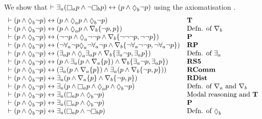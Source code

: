 \begin{example}\label{rml-s5-example-derivation}
We show that $\proves \somerefsA (\necessaryA \atomP \land \lnot \necessaryB \atomP) \iff (\atomP \land \possibleB \lnot \atomP)$ using the axiomatisation \axiomRmlS{}.
$$
\begin{array}{ll}
    \proves (\atomP \land \possibleB \lnot \atomP) \iff (\atomP \land \possibleA \atomP \land \possibleB \lnot \atomP) & {\bf T}\\
    \proves (\atomP \land \possibleB \lnot \atomP) \iff (\atomP \land \possibleA \atomP \land \coversB \{\lnot \atomP, \atomP\}) & \text{Defn. of $\coversB$}\\
    \proves (\atomP \land \possibleB \lnot \atomP) \iff (\lnot \lnot \atomP \land \possibleA \lnot \lnot \atomP \land \coversB \{\lnot \lnot \lnot \atomP, \lnot \lnot \atomP\}) & {\bf P}\\
    \proves (\atomP \land \possibleB \lnot \atomP) \iff (\lnot \allrefsA \lnot \atomP \possibleA \lnot \allrefsA \lnot \atomP \land \coversB \{\lnot \allrefsA \lnot \lnot \atomP, \lnot \allrefsA \lnot \atomP\}) & {\bf RP}\\
    \proves (\atomP \land \possibleB \lnot \atomP) \iff (\somerefsA \atomP \land \possibleA \somerefsA \atomP \land \coversB \{\somerefsA \lnot \atomP, \somerefsA \atomP\}) & \text{Defn. of $\somerefsA$}\\
    \proves (\atomP \land \possibleB \lnot \atomP) \iff (\atomP \land \somerefsA (\atomP \land \coversA \{\atomP\}) \land \coversB \{\somerefsA \lnot \atomP, \somerefsA \atomP\}) & {\bf RS5}\\
    \proves (\atomP \land \possibleB \lnot \atomP) \iff (\somerefsA (\atomP \land \coversA \{\atomP\}) \land \somerefsA (\atomP \land \coversB \{\lnot \atomP, \atomP\})) & {\bf RComm}\\
    \proves (\atomP \land \possibleB \lnot \atomP) \iff \somerefsA (\atomP \land \coversA \{\atomP\} \land \coversB \{\lnot \atomP, \atomP\}) & {\bf RDist}\\
    \proves (\atomP \land \possibleB \lnot \atomP) \iff \somerefsA (\atomP \land \necessaryA \atomP \land \possibleA \atomP \land \possibleB \lnot \atomP) & \text{Defn. of $\coversA$ and $\coversB$}\\
    \proves (\atomP \land \possibleB \lnot \atomP) \iff \somerefsA (\necessaryA \atomP \land \possibleB \lnot \atomP) & \text{Modal reasoning and {\bf T}}\\
    \proves (\atomP \land \possibleB \lnot \atomP) \iff \somerefsA (\necessaryA \atomP \land \possibleB \lnot \atomP) & {\bf P}\\
    \proves (\atomP \land \possibleB \lnot \atomP) \iff \somerefsA (\necessaryA \atomP \land \lnot \necessaryB \atomP) & \text{Defn. of $\possibleB$}
\end{array}
$$
\end{example}

